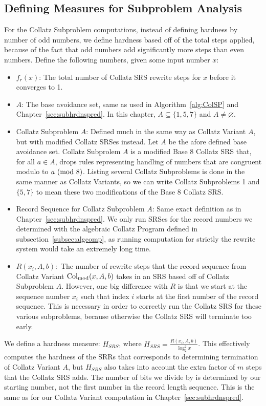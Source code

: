 \subsection{Defining Measures for Subproblem Analysis} \label{subsec:rewritemeasuredefs}
For the Collatz Subproblem computations, instead of defining hardness by number of odd numbers, we define hardness based off of the total steps applied, because of the fact that odd numbers add significantly more steps than even numbers. Define the following numbers, given some input number $x$:
\begin{itemize}
    \item $f_r(x)$: The total number of Collatz SRS rewrite steps for $x$ before it converges to 1.
    \item $A$: The base avoidance set, same as used in Algorithm~\ref{alg:ColSP} and Chapter~\ref{sec:subhrdnspred}. In this chapter, $A \subseteq \{1, 5, 7\}$ and $A \ne \varnothing$. 
    \item Collatz Subproblem $A$: Defined much in the same way as Collatz Variant $A$, but with modified Collatz SRSes instead. Let $A$ be the afore defined base avoidance set.  Collatz Subprolem $A$ is a modified Base 8 Collatz SRS that, for all $a \in A$, drops rules representing handling of numbers that are congruent modulo to $a \ (\mathrm{mod}\ 8)$. Listing several Collatz Subproblems is done in the same manner as Collatz Variants, so we can write Collatz Subproblems 1 and $\{5,7\}$ to mean these two modifications of the Base 8 Collatz SRS.
    \item Record Sequence for Collatz Subproblem $A$: Same exact definition as in Chapter~\ref{sec:subhrdnspred}. We only run SRSes for the record numbers we determined with the algebraic Collatz Program defined in subsection~\ref{subsec:algcomp}, as running computation for strictly the rewrite system would take an extremely long time.
    \item $R(x_i, A, b):$ The number of rewrite steps that the record sequence from Collatz Variant $\mathrm{Col}_{\text{mod}}(x,A,b)$ takes in an SRS based off of Collatz Subproblem $A$. However, one big difference with $R$ is that we start at the sequence number $x_i$ such that index $i$ starts at the first number of the record sequence. This is necessary in order to correctly run the Collatz SRS for these various subproblems, because otherwise the Collatz SRS will terminate too early.
\end{itemize}
We define a hardness measure: $H_{SRS}$, where $H_{SRS} = \frac{R(x_i, A, b)}{\log_2^2{x}}$. This effectively computes the hardness of the SRRs that corresponds to determining termination of Collatz Variant $A$, but $H_{SRS}$ also takes into account the extra factor of $m$ steps that the Collatz SRS adds. The number of bits we divide by is determined by our starting number, not the first number in the record length sequence. This is the same as for our Collatz Variant computation in Chapter~\ref{sec:subhrdnspred}.

